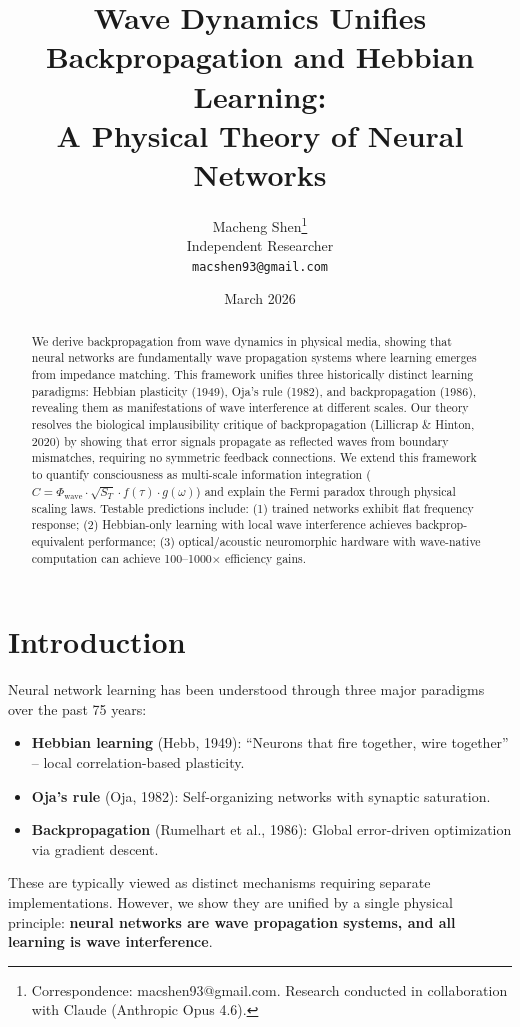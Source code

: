 \documentclass{article}
\title{Wave Dynamics Unifies Backpropagation and Hebbian Learning: \\
A Physical Theory of Neural Networks}
\author{
  Macheng Shen\thanks{Correspondence: macshen93@gmail.com. Research conducted in collaboration with Claude (Anthropic Opus 4.6).} \\
  Independent Researcher \\
  \texttt{macshen93@gmail.com}
}
\date{March 2026}
\begin{document}
\maketitle

\begin{abstract}
We derive backpropagation from wave dynamics in physical media, showing that neural networks are fundamentally wave propagation systems where learning emerges from impedance matching. This framework unifies three historically distinct learning paradigms: Hebbian plasticity (1949), Oja's rule (1982), and backpropagation (1986), revealing them as manifestations of wave interference at different scales. Our theory resolves the biological implausibility critique of backpropagation (Lillicrap \& Hinton, 2020) by showing that error signals propagate as reflected waves from boundary mismatches, requiring no symmetric feedback connections. We extend this framework to quantify consciousness as multi-scale information integration ($C = \Phi_{\text{wave}} \cdot \sqrt{S_T} \cdot f(\tau) \cdot g(\omega)$) and explain the Fermi paradox through physical scaling laws. Testable predictions include: (1) trained networks exhibit flat frequency response; (2) Hebbian-only learning with local wave interference achieves backprop-equivalent performance; (3) optical/acoustic neuromorphic hardware with wave-native computation can achieve 100--1000$\times$ efficiency gains.
\end{abstract}

\section{Introduction}

Neural network learning has been understood through three major paradigms over the past 75 years:

\begin{itemize}
\item \textbf{Hebbian learning} (Hebb, 1949): ``Neurons that fire together, wire together'' -- local correlation-based plasticity.
\item \textbf{Oja's rule} (Oja, 1982): Self-organizing networks with synaptic saturation.
\item \textbf{Backpropagation} (Rumelhart et al., 1986): Global error-driven optimization via gradient descent.
\end{itemize}

These are typically viewed as distinct mechanisms requiring separate implementations. However, we show they are unified by a single physical principle: \textbf{neural networks are wave propagation systems, and all learning is wave interference}.
\end{document}
